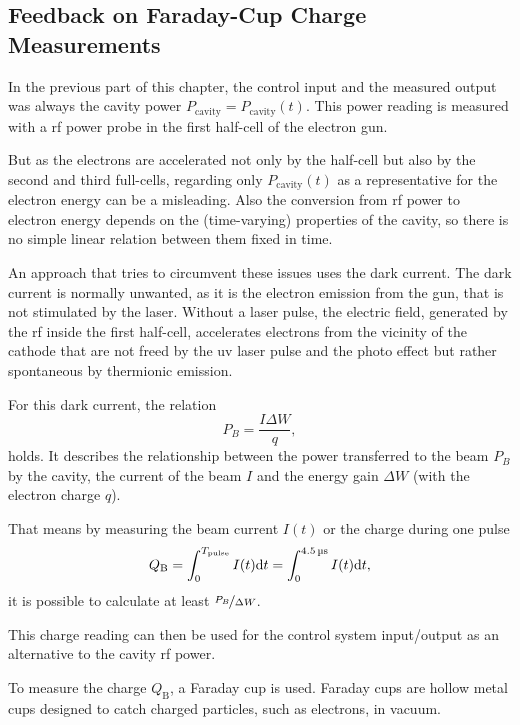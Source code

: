 \subsection{Feedback on Faraday-Cup Charge Measurements}
In the previous part of this chapter, the control input and the measured output was always the cavity power $P_\text{cavity}=P_\text{cavity}(t)$. This power reading is measured with a \gls{rf} power probe in the first half-cell of the electron gun.

But as the electrons are accelerated not only by the half-cell but also by the second and third full-cells, regarding only $P_\text{cavity}(t)$ as a representative for the electron energy can be a misleading. Also the conversion from \gls{rf} power to electron energy depends on the (time-varying) properties of the cavity, so there is no simple linear relation between them fixed in time.

An approach that tries to circumvent these issues uses the dark current. The dark current is normally unwanted, as it is the electron emission from the gun, that is not stimulated by the laser. Without a laser pulse, the electric field, generated by the \gls{rf} inside the first half-cell, accelerates electrons from the vicinity of the cathode that are not freed by the \gls{uv} laser pulse and the photo effect but rather spontaneous by thermionic emission.

For this dark current, the relation
\begin{equation}
P_B = \frac{I \Delta W}{q},
\end{equation}
holds. It describes the relationship between the power transferred to the beam $P_B$ by the cavity, the current of the beam $I$ and the energy gain $\Delta W$ (with the electron charge $q$). \cite[p.~43]{Wangler2008}

That means by measuring the beam current $I(t)$ or the charge during one pulse
\begin{equation}
Q_\text{B} = \int_{0}^{T_\text{pulse}} I(t) \text{d}{t} = \int_{0}^{\SI{4.5}{\micro\second}} I(t) \text{d}{t},
\end{equation}
it is possible to calculate at least $\nicefrac{P_B}{\Delta W}$.

This charge reading can then be used for the control system input/output as an alternative to the cavity \gls{rf} power.

To measure the charge $Q_\text{B}$, a Faraday cup is used. Faraday cups are hollow metal cups designed to catch charged particles, such as electrons, in vacuum. \cite{radiabeamFaradayCups}

